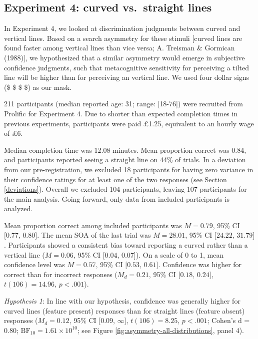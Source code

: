 \documentclass[12pt,twoside]{reedthesis}
\begin{document}
\hypertarget{experiment-4-curved-vs.-straight-lines}{%
\subsection{Experiment 4: curved vs.~straight lines}\label{experiment-4-curved-vs.-straight-lines}}

In Experiment 4, we looked at discrimination judgments between curved and vertical lines. Based on a search asymmetry for these stimuli {[}curved lines are found faster among vertical lines than vice versa; A. Treisman \& Gormican (1988){]}, we hypothesized that a similar asymmetry would emerge in subjective confidence judgments, such that metacognitive sensitivity for perceiving a tilted line will be higher than for perceiving an vertical line. We used four dollar signs (\$ \$ \$ \$) as our mask.

211 participants (median reported age: 31; range: {[}18-76{]}) were recruited from Prolific for Experiment 4. Due to shorter than expected completion times in previous experiments, participants were paid £1.25, equivalent to an hourly wage of £6.

Median completion time was 12.08 minutes. Mean proportion correct was 0.84, and participants reported seeing a straight line on 44\% of trials. In a deviation from our pre-registration, we excluded 18 participants for having zero variance in their confidence ratings for at least one of the two responses (see Section \ref{deviations}). Overall we excluded 104 participants, leaving 107 participants for the main analysis. Going forward, only data from included participants is analyzed.

Mean proportion correct among included participants was \(M = 0.79\), 95\% CI \([0.77\), \(0.80]\). The mean SOA of the last trial was \(M = 28.01\), 95\% CI \([24.22\), \(31.79]\). Participants showed a consistent bias toward reporting a curved rather than a vertical line (\(M = 0.06\), 95\% CI \([0.04\), \(0.07]\)). On a scale of 0 to 1, mean confidence level was \(M = 0.57\), 95\% CI \([0.53\), \(0.61]\). Confidence was higher for correct than for incorrect responses (\(M_d = 0.21\), 95\% CI \([0.18\), \(0.24]\), \(t(106) = 14.96\), \(p < .001\)).

\emph{Hypothesis 1}: In line with our hypothesis, confidence was generally higher for curved lines (feature present) responses than for straight lines (feature absent) responses (\(M_d = 0.12\), 95\% CI \([0.09\), \(\infty]\), \(t(106) = 8.25\), \(p < .001\); Cohen's d = 0.80; \(\mathrm{BF}_{\textrm{10}} = 1.61 \times 10^{10}\); see Figure \ref{fig:asymmetry-all-distributions}, panel 4).
\end{document}
